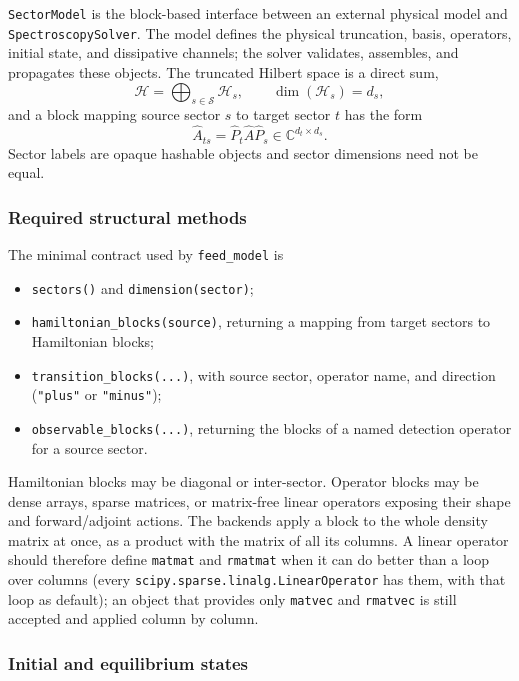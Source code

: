 \documentclass[11pt]{article}
\begin{document}
\noindent \texttt{SectorModel} is the block-based interface between an external physical model and \texttt{SpectroscopySolver}. The model defines the physical truncation, basis, operators, initial state, and dissipative channels; the solver validates, assembles, and propagates these objects. The truncated Hilbert space is a direct sum,
\begin{equation}
    \mathcal{H}=\bigoplus_{s\in\mathcal{S}}\mathcal{H}_s,
    \qquad \dim(\mathcal{H}_s)=d_s,
\end{equation}
and a block mapping source sector $s$ to target sector $t$ has the form
\begin{equation}
    \hat{A}_{ts}=\hat{P}_t \hat{A} \hat{P}_s\in\mathbb{C}^{d_t\times d_s}.
\end{equation}
Sector labels are opaque hashable objects and sector dimensions need not be equal.

\subsubsection{Required structural methods}

The minimal contract used by \texttt{feed\_model} is
\begin{itemize}
    \item \texttt{sectors()} and \texttt{dimension(sector)};
    \item \texttt{hamiltonian\_blocks(source)}, returning a mapping from target sectors to Hamiltonian blocks;
    \item \texttt{transition\_blocks(...)}, with source sector, operator name, and direction (\texttt{"plus"} or \texttt{"minus"});
    \item \texttt{observable\_blocks(...)}, returning the blocks of a named detection operator for a source sector.
\end{itemize}
Hamiltonian blocks may be diagonal or inter-sector. Operator blocks may be dense arrays, sparse matrices, or matrix-free linear operators exposing their shape and forward/adjoint actions. The backends apply a block to the whole density matrix at once, as a product with the matrix of all its columns. A linear operator should therefore define \texttt{matmat} and \texttt{rmatmat} when it can do better than a loop over columns (every \texttt{scipy.sparse.linalg.LinearOperator} has them, with that loop as default); an object that provides only \texttt{matvec} and \texttt{rmatvec} is still accepted and applied column by column.

\subsubsection{Initial and equilibrium states}
\end{document}
